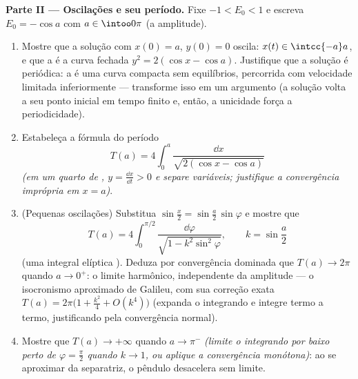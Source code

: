 \begin{problem}
\medskip
\noindent\textbf{Parte II --- Oscilações e seu período.} Fixe $-1 < E_0 < 1$ e
escreva $E_0 = -\cos a$ com $a \in
\intoo0\pi$ (a amplitude).
\begin{enumerate}[resume]
  \item Mostre que a solução com $x(0) = a$, $y(0) = 0$ oscila: $x(t) \in \intcc{-a}a$, e que a
         é a curva fechada $y^2 = 2(\cos x - \cos a)$. Justifique que a solução é
        periódica: a  é uma curva compacta sem equilíbrios,
        percorrida com velocidade limitada inferiormente --- transforme
        isso em um argumento (a solução volta a seu ponto inicial em
        tempo finito e, então, a unicidade força a periodicidade).
  \item Estabeleça a fórmula do período
        \[
        T(a) = 4\int_0^{a}\frac{\dd x}{\sqrt{2(\cos x -
        \cos a)}}
        \]
        \emph{(em um quarto de , $y = \frac{\dd x}{\dd t} >
        0$ e separe variáveis;
        justifique a convergência imprópria em $x = a$)}.
  \item (Pequenas oscilações) Substitua $\sin\frac x2 =
        \sin\frac a2\,\sin\varphi$ e mostre que
        \[
        T(a) = 4\int_0^{\pi/2}\frac{\dd\varphi}{\sqrt{1 -
        k^2\sin^2\varphi}},
        \qquad k = \sin\frac a2
        \]
        (uma integral elíptica ). Deduza por convergência
        dominada que $T(a) \to 2\pi$ quando $a \to 0^+$: o limite harmônico,
        independente da amplitude --- o isocronismo aproximado de
        Galileu, com sua correção exata $T(a) = 2\pi\bigl(1 + \frac{k^2}4 +
        O(k^4)\bigr)$ (expanda o integrando e
        integre termo a termo, justificando pela convergência normal).
  \item Mostre que $T(a) \to +\infty$ quando $a \to \pi^-$ \emph{(limite o integrando por
        baixo perto de $\varphi =
        \frac\pi2$ quando $k \to 1$, ou aplique a convergência
        monótona)}: ao se aproximar da separatriz, o pêndulo desacelera
        sem limite.
\end{enumerate}


\end{problem}
